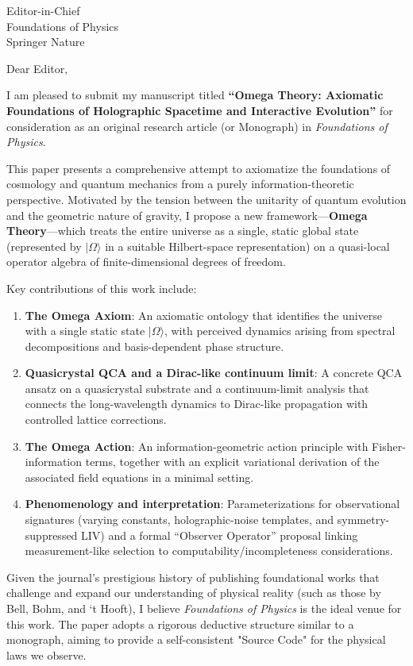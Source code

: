 \documentclass[11pt]{letter}
\date{\today}
\begin{document}
\begin{letter}{Editor-in-Chief \\ Foundations of Physics \\ Springer Nature}

\opening{Dear Editor,}

I am pleased to submit my manuscript titled \textbf{``Omega Theory: Axiomatic Foundations of Holographic Spacetime and Interactive Evolution''} for consideration as an original research article (or Monograph) in \textit{Foundations of Physics}.

This paper presents a comprehensive attempt to axiomatize the foundations of cosmology and quantum mechanics from a purely information-theoretic perspective. Motivated by the tension between the unitarity of quantum evolution and the geometric nature of gravity, I propose a new framework---\textbf{Omega Theory}---which treats the entire universe as a single, static global state (represented by $|\Omega\rangle$ in a suitable Hilbert-space representation) on a quasi-local operator algebra of finite-dimensional degrees of freedom.

Key contributions of this work include:
\begin{enumerate}
    \item \textbf{The Omega Axiom}: An axiomatic ontology that identifies the universe with a single static state $|\Omega\rangle$, with perceived dynamics arising from spectral decompositions and basis-dependent phase structure.
    \item \textbf{Quasicrystal QCA and a Dirac-like continuum limit}: A concrete QCA ansatz on a quasicrystal substrate and a continuum-limit analysis that connects the long-wavelength dynamics to Dirac-like propagation with controlled lattice corrections.
    \item \textbf{The Omega Action}: An information-geometric action principle with Fisher-information terms, together with an explicit variational derivation of the associated field equations in a minimal setting.
    \item \textbf{Phenomenology and interpretation}: Parameterizations for observational signatures (varying constants, holographic-noise templates, and symmetry-suppressed LIV) and a formal ``Observer Operator'' proposal linking measurement-like selection to computability/incompleteness considerations.
\end{enumerate}

Given the journal's prestigious history of publishing foundational works that challenge and expand our understanding of physical reality (such as those by Bell, Bohm, and ‘t Hooft), I believe \textit{Foundations of Physics} is the ideal venue for this work. The paper adopts a rigorous deductive structure similar to a monograph, aiming to provide a self-consistent "Source Code" for the physical laws we observe.


\end{letter}
\end{document}
